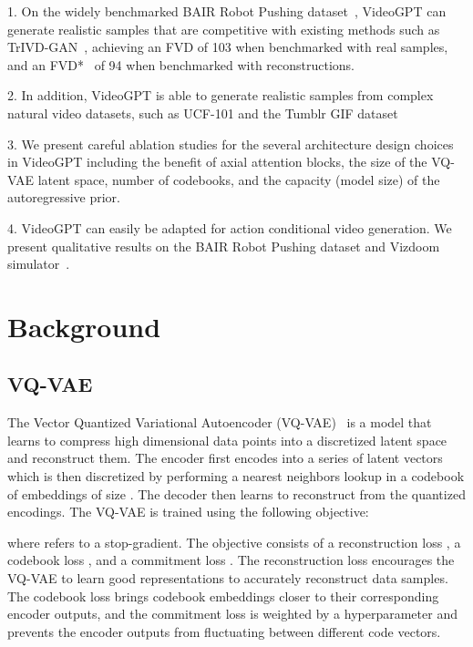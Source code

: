 \documentclass{article}
\begin{document}
1. On the widely benchmarked BAIR Robot Pushing dataset~\citep{ebert2017self}, VideoGPT can generate realistic samples that are competitive with existing methods such as TrIVD-GAN~\citep{luc2020transformation}, achieving an FVD of 103 when benchmarked with real samples, and an FVD*~\citep{razavi2019generating} of 94 when benchmarked with reconstructions.

2. In addition, VideoGPT is able to generate realistic samples from complex natural video datasets, such as UCF-101 and the Tumblr GIF dataset

3. We present careful ablation studies for the several architecture design choices in VideoGPT including the benefit of axial attention blocks, the size of the VQ-VAE latent space, number of codebooks, and the capacity (model size) of the autoregressive prior.

4. VideoGPT can easily be adapted for action conditional video generation. We present qualitative results on the BAIR Robot Pushing dataset and Vizdoom simulator~\citep{kempka2016vizdoom}. \\
 

\section{Background}

\subsection{VQ-VAE}
The Vector Quantized Variational Autoencoder (VQ-VAE)~\citep{van2017neural} is a model that learns to compress high dimensional data points into a discretized latent space and reconstruct them. The encoder  first encodes  into a series of latent vectors  which is then discretized by performing a nearest neighbors lookup in a codebook of embeddings  of size . The decoder  then learns to reconstruct  from the quantized encodings. The VQ-VAE is trained using the following objective:


where  refers to a stop-gradient. The objective consists of a reconstruction loss , a codebook loss , and a commitment loss . The reconstruction loss encourages the VQ-VAE to learn good representations to accurately reconstruct data samples. The codebook loss brings codebook embeddings closer to their corresponding encoder outputs, and the commitment loss is weighted by a hyperparameter  and prevents the encoder outputs from fluctuating between different code vectors. 
\end{document}
